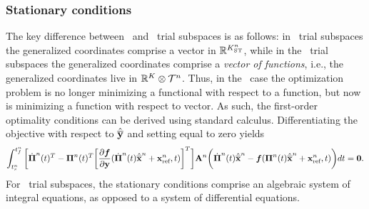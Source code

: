 \subsubsection{Stationary conditions} 
The key difference between \spaceTimeAcronym\ and \spatialAcronym\ trial subspaces is as follows: in \spaceTimeAcronym\ trial subspaces the generalized coordinates comprise a vector in $\mathbb{R}^{K_{\text{ST}}^{n}}$, while in the \spatialAcronym\ trial subspaces the generalized coordinates comprise a \textit{vector of functions}, i.e., the generalized coordinates live in $\mathbb{R}^{K} \otimes \mathcal{T}^{n}$. 
Thus, in the \spaceTimeAcronym\ case the optimization problem is no longer minimizing a functional with respect to a function, but now is minimizing a function with 
respect to vector.  As such, the first-order optimality conditions can be
	derived using standard calculus. Differentiating the objective with respect
	to $\hat{\mathbf{\overline{y}}}$ and setting equal to zero yields 
\begin{equation}\label{eq:st_stationary}
 \int_{t_s^{n}}^{t_f^{n}} \bigg[ \dot{\boldsymbol \Pi}^{n}(t)^T  - \boldsymbol \Pi^{n}(t)^T \bigg[\frac{\partial
\boldsymbol f}{\partial \mathbf{y}} (\dot{\boldsymbol \Pi}^{n}(t) \hat{\mathbf{\overline{x}}}^{n} +                    
\mathbf{x}_\text{ref}^{n},t)\bigg]^T  \bigg] \mathbf{A}^{n} \bigg( \dot{\boldsymbol \Pi}^{n}(t) \hat{\mathbf{\overline{x}}}^{n}  - \boldsymbol f (\boldsymbol \Pi^{n}(t) \hat{\mathbf{\overline{x}}}^{n} + \mathbf{x}_\text{ref}^{n},t) \bigg) dt = \boldsymbol 0.\end{equation}
For \spaceTimeAcronym\ trial subspaces, the stationary conditions comprise an algebraic system of integral equations, as opposed to a system of differential equations.
